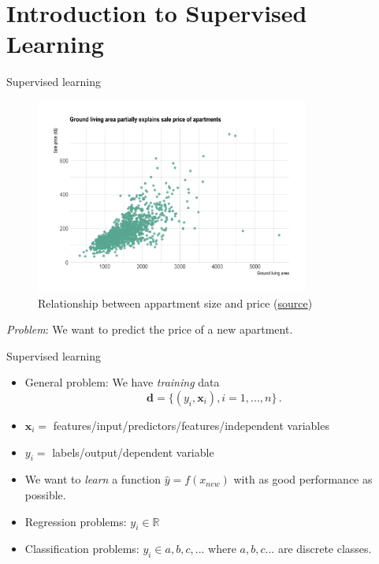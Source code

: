 \documentclass[10pt]{beamer}
\begin{document}

\section{Introduction to Supervised Learning}
\frame{\sectionpage}

\begin{frame}{Supervised learning}

\begin{figure}[h]
\caption{Relationship between appartment size and price (\href{https://www.data-to-viz.com/story/TwoNum.html}{source})}
\centering
\includegraphics[width=0.8\textwidth]{figs/scatter_apartment.png}
\end{figure}

\emph{Problem}: We want to predict the price of a new apartment.

\end{frame}



\begin{frame}{Supervised learning}

\begin{itemize}
\item General problem: We have \emph{training} data
\[
\mathbf{d} = \{(y_i, \mathbf{x}_i), i = 1, ..., n\} \,.
\]
\item $\mathbf{x}_i = $ features/input/predictors/features/independent variables
\item $y_i = $ labels/output/dependent variable
\item We want to \emph{learn} a function $\hat{y} = f(x_{new})$ with as good performance as possible.\pause
\item Regression problems: $y_i \in \mathbb{R}$
\item Classification problems: $y_i \in {a,b,c,...}$ where $a,b,c ...$ are discrete classes.
\end{itemize}

\end{frame}
\end{document}
